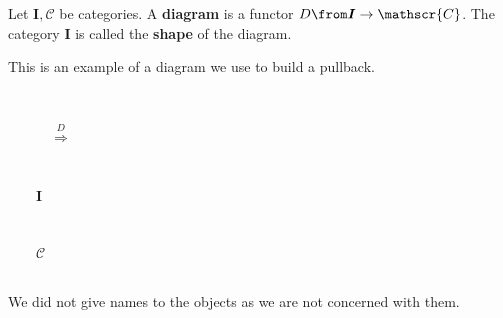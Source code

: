 \begin{definition}
  Let $\bm{I}, \mathscr{C}$ be categories.
  A \textbf{diagram} is a functor $D \from \bm{I} \to \mathscr{C}$.
  The category $\bm{I}$ is called the \textbf{shape} of the diagram.
\end{definition}
\begin{example}
  \label{diagramexample}
  This is an example of a diagram we use to build a pullback. \\[1cm]
  \begin{minipage}{0.3\linewidth}
    \hspace{2cm}
    \\
  \end{minipage}%
  \begin{minipage}{0.2\linewidth}
    $\qquad\quad\overset{D}{\Longrightarrow}$
  \end{minipage}%
  \begin{minipage}{0.1\linewidth}
  \end{minipage}\\[2em]
  \begin{minipage}{0.3\linewidth}
    \hspace{2cm}
    $\qquad \bm I$
  \end{minipage}%
  \begin{minipage}{0.2\linewidth}
    \
  \end{minipage}%
  \begin{minipage}{0.3\linewidth}
    \hspace{2cm}
    $\qquad \mathscr C$
  \end{minipage}\\[1em]
  We did not give names to the objects as we are not concerned with them.
\end{example}

